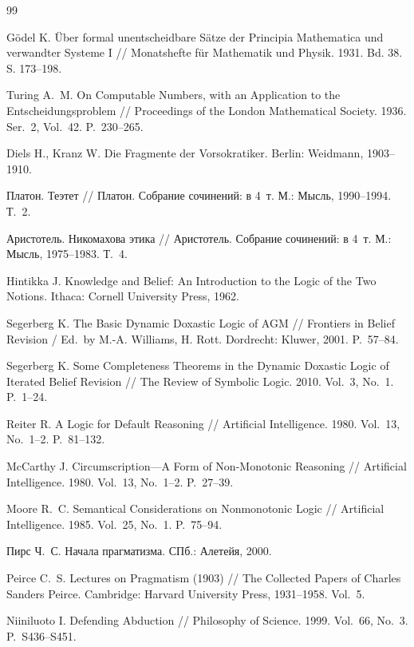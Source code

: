 \documentclass[12pt,a4paper]{article}
\begin{document}
\begin{thebibliography}{99}

	 Gödel K. Über formal unentscheidbare Sätze der Principia Mathematica und verwandter Systeme I // Monatshefte für Mathematik und Physik. 1931. Bd. 38. S. 173--198.

	 Turing A.~M. On Computable Numbers, with an Application to the Entscheidungsproblem // Proceedings of the London Mathematical Society. 1936. Ser.~2, Vol.~42. P.~230--265.

	 Diels H., Kranz W. Die Fragmente der Vorsokratiker. Berlin: Weidmann, 1903--1910.

	 Платон. Теэтет // Платон. Собрание сочинений: в 4~т. М.: Мысль, 1990--1994. Т.~2.

	 Аристотель. Никомахова этика // Аристотель. Собрание сочинений: в 4~т. М.: Мысль, 1975--1983. Т.~4.

	 Hintikka J. Knowledge and Belief: An Introduction to the Logic of the Two Notions. Ithaca: Cornell University Press, 1962.

	 Segerberg K. The Basic Dynamic Doxastic Logic of AGM // Frontiers in Belief Revision / Ed.~by M.-A. Williams, H. Rott. Dordrecht: Kluwer, 2001. P.~57--84.

	 Segerberg K. Some Completeness Theorems in the Dynamic Doxastic Logic of Iterated Belief Revision // The Review of Symbolic Logic. 2010. Vol.~3, No.~1. P.~1--24.

	 Reiter R. A Logic for Default Reasoning // Artificial Intelligence. 1980. Vol.~13, No.~1--2. P.~81--132.

	 McCarthy J. Circumscription---A Form of Non-Monotonic Reasoning // Artificial Intelligence. 1980. Vol.~13, No.~1--2. P.~27--39.

	 Moore R.~C. Semantical Considerations on Nonmonotonic Logic // Artificial Intelligence. 1985. Vol.~25, No.~1. P.~75--94.

	 Пирс Ч.~С. Начала прагматизма. СПб.: Алетейя, 2000.

	 Peirce C.~S. Lectures on Pragmatism (1903) // The Collected Papers of Charles Sanders Peirce. Cambridge: Harvard University Press, 1931--1958. Vol.~5.

	 Niiniluoto I. Defending Abduction // Philosophy of Science. 1999. Vol.~66, No.~3. P.~S436--S451.


\end{thebibliography}
\end{document}
